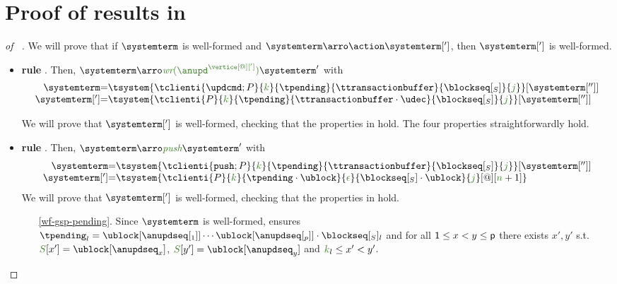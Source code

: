 
\section{Proof of results in }

\begin{proof} [of ~]
 We will prove that if $\systemterm$ is well-formed and $\systemterm\arroi{\action}\systemterm[']$, then $\systemterm[']$ is well-formed.



			
	\begin{itemize}

		\item {\bf rule }. Then, $\systemterm  \arroi{\updatetranaux{\anupd^{\vertice[@][']}}} \systemterm '$ with 
				\[\begin{array}{r@{=}l}
					\systemterm & \tsystem{\tclienti{\tupdateins}{\tknown}{\tpending}{\ttransactionbuffer}{\tsent}{\treceivebuffer}}[{\systemterm['']}]
					\\
					\systemterm['] & \tsystem{\tclienti{\tprogram}{\tknown}{\tpending}{\ttransactionbuffer \cdot \tupdate}{\tsent}{\treceivebuffer}}[{\systemterm['']}]	
				  \end{array}
				\]
				
				We will prove that $\systemterm[']$ is well-formed, checking that the properties in  hold. The four properties straightforwardly hold.
		
		\item {\bf rule }. Then, $\systemterm  \arroi{\pushtran} \systemterm '$ with 
				\[\begin{array}{r@{=}l}
					\systemterm & \tsystem{\tclienti{\tpushins}{\tknown}{\tpending}{\ttransactionbuffer}{\tsent}{\treceivebuffer}}[{\systemterm['']}]
					\\
					\systemterm['] & \tsystem{\tclienti{\tprogram}{\tknown}{\tpending \cdot \ublock}{\emptysequence}{\tsent \cdot \ublock}{\treceivebuffer}[@][{\trounds+1}]}	
				  \end{array}
				\]
				We will prove that $\systemterm[']$ is well-formed, checking that the properties in  hold.

				\begin{enumerate}
					\item[\ref{wf-gsp-pending}.] Since $\systemterm$ is well-formed,  ensures
					$\tpending_l = \ublock[{\anupdseq[_1]}]\cdots\ublock[{\anupdseq[_p]}]\cdot\tsent_l$ and 
  for all ${\sf 1} \leq x < y \leq{\sf p}$ there exists $x',y'$ s.t. $\queuemessage[x'] = \ublock[{\anupdseq}_x]$, $\queuemessage[y'] =\ublock[{\anupdseq}_y]$ and 
  $\tknown_l\leq x' < y'$.
					
				\end{enumerate}	
		\end{itemize}		
	
\end{proof}
